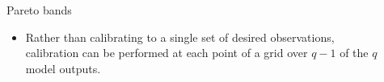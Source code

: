 \documentclass[final]{beamer}
\newlength{\sepwid}
\newlength{\onecolwid}
\newlength{\twocolwid}
\begin{document}
\begin{frame}[t]
\begin{columns}[t]
\begin{column}{\twocolwid}
\begin{columns}[t,totalwidth=\twocolwid]
\begin{column}{\onecolwid}
%
%
%
%
%


\end{column} %

\end{columns} %

\end{column} %

\begin{column}{\sepwid}\end{column} %

\begin{column}{\onecolwid} %


\begin{alertblock}{Pareto bands}

\begin{itemize}

\item Rather than calibrating to a single set of desired observations, calibration can be performed at each point of a grid over $q-1$ of the $q$ model outputs.


\end{itemize}
\end{alertblock}
\end{column}
\end{columns}
\end{frame}
\end{document}
